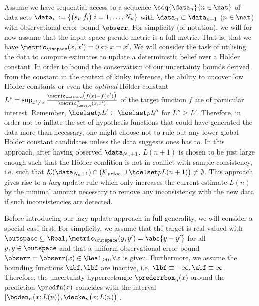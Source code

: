 Assume we have sequential access to a sequence $\seq{\data_n}{n \in \nat}$ of data sets $\data_n:= \{\bigl( s_i, \tilde f_i \bigr) \vert i=1,\ldots, N_n\} $ with $\data_n \subset \data_{n+1}$ ($n \in \nat$) with observational error bound $\obserr$. For simplicity (of notation), we will for now assume that the input space pseudo-metric is a full metric. That is, that we have $\metric_\inspace(x,x') = 0 \Leftrightarrow x=x'$.
  We will consider the task of utilising the data to compute estimates to update a deterministic belief over a H\"older constant. In order to bound the conservatism of our uncertainty bounds derived from the constant in the context of kinky inference, the ability to uncover low H\"older constants or even the \emph{optimal} H\"older constant $L^* = \sup_{x'\neq x } \frac{\metric_\outspace \bigl(f(x) - f(x')\bigr)}{\metric_{\inspace}^p(x,x') }$ of the target function $f$ are of particular interest. 
Remember, $\hoelset p {} {L'}  \subset \hoelset p {} {L''} $ for $L'' \geq L'$. Therefore, in order not to inflate the set of hypothesis functions that could have generated the data more than necessary, one might choose not to rule out any lower global H\"older constant candidates unless the data suggests ones has to. In this approach, after having observed $\data_{N_n+1}$, $L(n+1)$ is chosen to be just large enough such that the H\"older condition is not in conflict with sample-consistency, i.e. such that $\mathcal K(\data_{N_n+1}) \cap \bigl(  \mathcal K_{prior} \cup \hoelset p {} {L(n+1)} \bigr) \neq \emptyset$. This approach gives rise to a \emph{lazy} update rule which only increases the current estimate $L(n)$ by the minimal amount necessary to remove any inconsistency with the new data if such inconsistencies are detected. %

Before introducing our lazy update approach in full generality, we will consider a special case first:
For simplicity, we assume that the target is real-valued with $\outspace \subseteq \Real, \metric_\outspace(y,y') = \abs{y-y'}$ for all $y,y \in \outspace$ and that a uniform observational error bound $\obserr =\obserr(x) \in \Real_{\geq 0}, \forall x$ is given. Furthermore, we assume the bounding functions $\ubf,\lbf$ are inactive, i.e. $\lbf \equiv -\infty, \ubf \equiv \infty$. Therefore, the uncertainty hyperrectangle $\prederrbox_n(x)$ around the prediction $\predfn(x)$ coincides with the interval $[\boden_n\bigl(x; L(n)\bigr) ,\decke_n\bigl(x; L(n)\bigr)]$.


